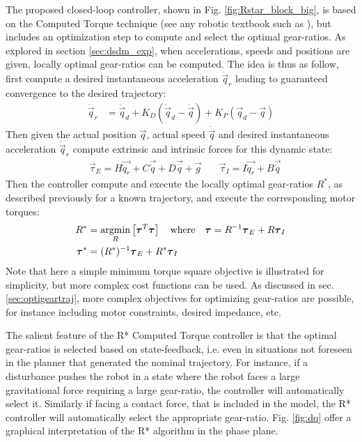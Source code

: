 The proposed closed-loop controller, shown in Fig. \ref{fig:Rstar_block_big}, is based on the Computed Torque technique (see any robotic textbook such as \cite{asada_robot_1986}), but includes an optimization step to compute and select the optimal gear-ratios. As explored in section \ref{sec:dsdm_exp}, when accelerations, speeds and positions are given, locally optimal gear-ratios can be computed. The idea is thus as follow, first compute a desired instantaneous acceleration $\ddot{\vec{q}}_r$ leading to guaranteed convergence to the desired trajectory:
%
\begin{align}
\ddot{\vec{q}}_r &= \ddot{\vec{q}}_d + K_D ( \dot{\vec{q}}_d - \dot{\vec{q}} ) + K_P ( \vec{q}_d - \vec{q} ) 
\end{align} 
%
Then given the actual position $\vec{q}$, actual speed $\dot{\vec{q}}$ and desired instantaneous acceleration $\ddot{\vec{q}}_r$ compute extrinsic and intrinsic forces for this dynamic state:
%
\begin{align}
	&\vec{\tau}_{E} = H \vec{ \ddot{q}_r } + C\vec{ \dot{q} } + D \vec{ \dot{q} } + \vec{ g } \quad
	&\vec{\tau}_{I} = I \vec{ \ddot{q}_r } + B \vec{ \dot{q} } 
\end{align}
%
Then the controller compute and execute the locally optimal gear-ratios $R^*$, as described previously for a known trajectory, and execute the corresponding motor torques: 
%
\begin{align}
R^{*} &= \operatornamewithlimits{argmin}\limits_{R} \left[ \vec{\tau}^T\vec{\tau}  \right] \quad\text{where}\quad \vec{\tau} = R^{-1} \vec{\tau}_{E} + R \vec{\tau}_{I}
\\
\vec{\tau}^* &= (R^*)^{-1} \vec{\tau}_{E} + R^* \vec{\tau}_{I}
\end{align} 
%
Note that here a simple minimum torque square objective is illustrated for simplicity, but more complex cost functions can be used. As discussed in sec. \ref{sec:optigeartraj}, more complex objectives for optimizing gear-ratios are possible, for instance including motor constraints, desired impedance, etc. 


The salient feature of the R* Computed Torque controller is that the optimal gear-ratios is selected based on state-feedback, i.e. even in situations not foreseen in the planner that generated the nominal trajectory. For instance, if a disturbance pushes the robot in a state where the robot faces a large gravitational force requiring a large gear-ratio, the controller will automatically select it. Similarly if facing a contact force, that is included in the model, the R* controller will automatically select the appropriate gear-ratio. Fig. \ref{fig:dq} offer a graphical interpretation of the R* algorithm in the phase plane. 

